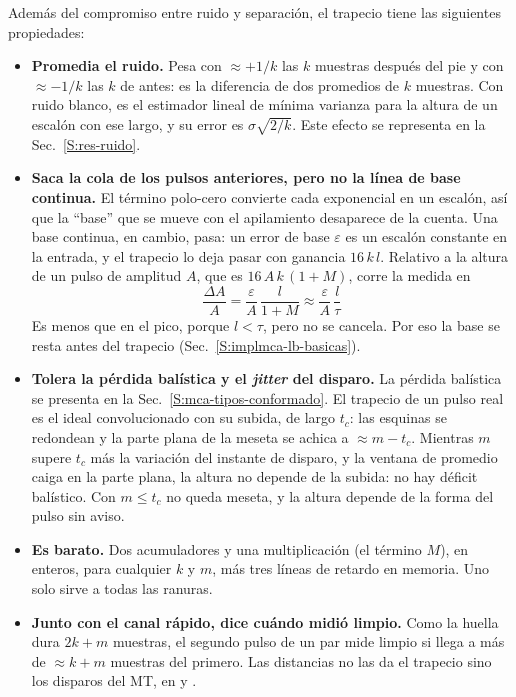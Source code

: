 Además del compromiso entre ruido y separación, el trapecio tiene las siguientes
propiedades:
\begin{itemize}
  \item \textbf{Promedia el ruido.} Pesa con $\approx +1/k$ las $k$ muestras
    después del pie y con $\approx -1/k$ las $k$ de antes: es la diferencia de
    dos promedios de $k$ muestras. Con ruido blanco, es el estimador lineal de
    mínima varianza para la altura de un escalón con ese largo, y su error es
    $\sigma\sqrt{2/k}$. Este efecto se representa en la
    Sec.~\ref{S:res-ruido}.
  \item \textbf{Saca la cola de los pulsos anteriores, pero no la línea de base
    continua.} El término polo-cero convierte cada exponencial en un escalón,
    así que la ``base'' que se mueve con el apilamiento desaparece de la cuenta.
    Una base continua, en cambio, pasa: un error de base $\varepsilon$ es un
    escalón constante en la entrada, y el trapecio lo deja pasar con ganancia
    $16\,k\,l$. Relativo a la altura de un pulso de amplitud $A$, que es
    $16\,A\,k\,(1+M)$, corre la medida en
    \begin{equation}
      \frac{\Delta A}{A} = \frac{\varepsilon}{A}\,\frac{l}{1+M} \approx
      \frac{\varepsilon}{A}\,\frac{l}{\tau}
      \label{e:implmca-error-base}
    \end{equation}
    Es menos que en el pico, porque $l < \tau$, pero no se cancela. Por eso la
    base se resta antes del trapecio (Sec.~\ref{S:implmca-lb-basicas}).
  \item \textbf{Tolera la pérdida balística y el \emph{jitter} del disparo.} La pérdida
    balística se presenta en la Sec.~\ref{S:mca-tipos-conformado}. El trapecio
    de un pulso real es el ideal convolucionado con su subida, de largo $t_c$:
    las esquinas se redondean y la parte plana de la meseta se achica a
    $\approx m - t_c$. Mientras $m$ supere $t_c$ más la variación del instante
    de disparo, y la ventana de promedio caiga en la parte plana, la altura no
    depende de la subida: no hay déficit balístico. Con $m \le t_c$ no queda
    meseta, y la altura depende de la forma del pulso sin aviso.
  \item \textbf{Es barato.} Dos acumuladores y una multiplicación (el término
    $M$), en enteros, para cualquier $k$ y $m$, más tres líneas de retardo en
    memoria. Uno solo sirve a todas las ranuras.
  \item \textbf{Junto con el canal rápido, dice cuándo midió limpio.} Como la
    huella dura $2k+m$ muestras, el segundo pulso de un par mide limpio si llega
    a más de $\approx k+m$ muestras del primero. Las distancias no las da el
    trapecio sino los disparos del MT, en  y
    .
\end{itemize}

